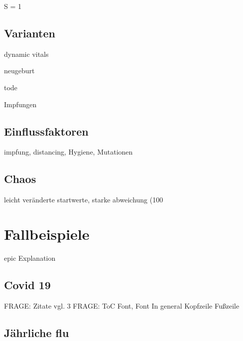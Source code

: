 \documentclass[12pt]{scrartcl} %
\begin{document}
S = 1 


\subsection{Varianten}

dynamic vitals

\textnu neugeburt

\textmu tode

\textrho Impfungen


\newpage
\subsection{Einflussfaktoren}

impfung, distancing, Hygiene, Mutationen


\newpage
\subsection{Chaos}

leicht veränderte startwerte, starke abweichung (100%


\newpage
\section{Fallbeispiele}

epic Explanation


\subsection{Covid 19}

FRAGE: Zitate vgl. 3
FRAGE: ToC Font, Font In general
Kopfzeile Fußzeile

\newpage
\subsection{Jährliche flu}

\newpage %
\end{document}
